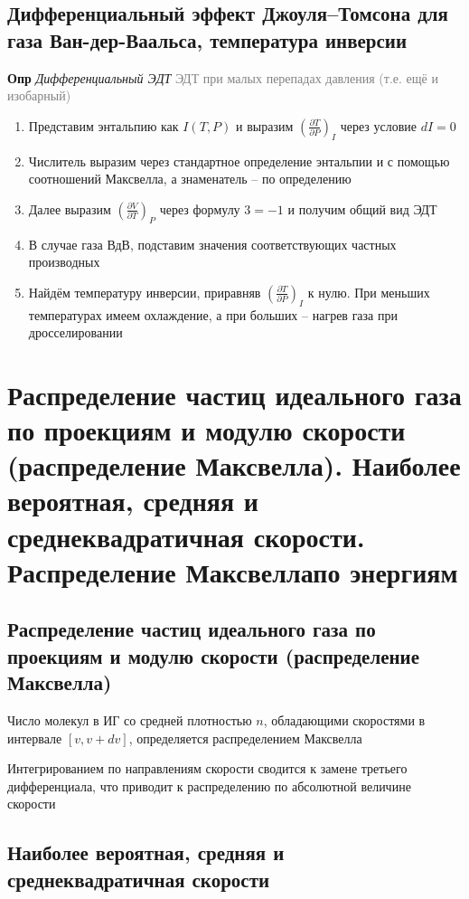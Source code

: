 \documentclass[a4paper, 14pt]{article}
\begin{document}
    \subsection{Дифференциальный эффект Джоуля–Томсона для газа Ван-дер-Ваальса, температура инверсии}

    \textbf{Опр} \textit{Дифференциальный ЭДТ} \textcolor{gray}{ЭДТ при малых перепадах давления (т.е. ещё и изобарный)}

    \begin{enumerate}
        \item Представим энтальпию как $I(T, P)$ и выразим $(\frac{\partial T}{\partial P})_I$ через условие $dI = 0$
        \item Числитель выразим через стандартное определение энтальпии и с помощью соотношений Максвелла, а
        знаменатель -- по определению
        \item Далее выразим $(\frac{\partial V}{\partial T})_P$ через формулу $3 = -1$ и получим общий вид ЭДТ
        \item В случае газа ВдВ, подставим значения соответствующих частных производных
        \item Найдём температуру инверсии, приравняв $(\frac{\partial T}{\partial P})_I$ к нулю.
        При меньших температурах имеем охлаждение, а при больших -- нагрев газа при дросселировании
    \end{enumerate}

    \section{Распределение частиц идеального газа по проекциям и модулю скорости (распределение Максвелла).
    Наиболее вероятная, средняя и среднеквадратичная скорости.
    Распределение Максвеллапо энергиям}

    \subsection{Распределение частиц идеального газа по проекциям и модулю скорости (распределение Максвелла)}

    Число молекул в ИГ со средней плотностью $n$, обладающими скоростями в интервале $[v, v + dv]$, определяется
    распределением Максвелла

    Интегрированием по направлениям скорости сводится к замене третьего дифференциала, что приводит к распределению
    по абсолютной величине скорости

    \subsection{Наиболее вероятная, средняя и среднеквадратичная скорости}
\end{document}

